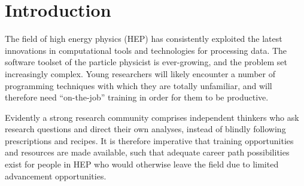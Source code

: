 \documentclass[12pt,a4paper]{article}
\begin{document}
%
%
%
%



\section{Introduction}

The field of high energy physics (HEP) has consistently exploited
the latest innovations in computational tools and technologies for processing data.
The software toolset of the particle physicist is ever-growing, and the problem
set increasingly complex. Young researchers will likely encounter a number of
programming techniques with which they are totally unfamiliar, and will therefore
need ``on-the-job'' training in order for them to be productive.

Evidently a strong research community comprises independent thinkers who ask
research questions and direct their own analyses, instead of blindly following
prescriptions and recipes. It is therefore imperative that training opportunities
and resources are made available, such that adequate career
path possibilities exist for people in HEP who would otherwise leave the field
due to limited advancement opportunities.
\end{document}
